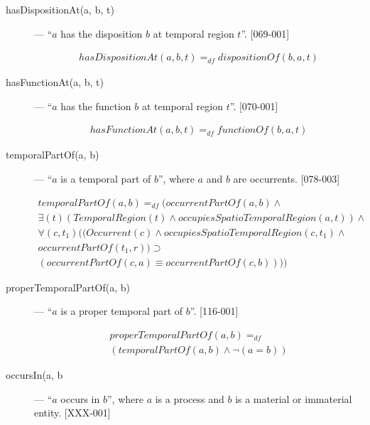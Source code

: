 \documentclass{article}
\newcommand{\DF}{\ensuremath{=_{df}}}
\begin{document}
\begin{description}
\item[hasDispositionAt(a, b, t)] --- ``$a$ has the disposition $b$ at temporal region $t$''. [069-001]

\begin{equation}
\begin{split}
hasDispositionAt(a, b, t) \DF dispositionOf(b, a, t)
\end{split}
\end{equation}

\item[hasFunctionAt(a, b, t)] --- ``$a$ has the function $b$ at temporal region $t$''. [070-001]

\begin{equation}
\begin{split}
hasFunctionAt(a, b, t) \DF functionOf(b, a, t)
\end{split}
\end{equation}

\item[temporalPartOf(a, b)] --- ``$a$ is a temporal part of $b$'', where $a$ and $b$ are occurrents. [078-003]

\begin{equation}
\begin{split}
temporalPartOf(a, b) \DF (occurrentPartOf(a, b) \wedge \\
{\exists}(t)(TemporalRegion(t) \wedge occupiesSpatioTemporalRegion(a, t)) \wedge \\
{\forall}(c, t_1)((Occurrent(c) \wedge occupiesSpatioTemporalRegion(c, t_1) \wedge \\
occurrentPartOf(t_1, r)) \supset \\
(occurrentPartOf(c, a) \equiv occurrentPartOf(c, b))))
\end{split}
\end{equation}

\item[properTemporalPartOf(a, b)] --- ``$a$ is a proper temporal part of $b$''. [116-001]

\begin{equation}
\begin{split}
properTemporalPartOf(a, b) \DF \\
(temporalPartOf(a, b) \wedge {\neg}(a = b))
\end{split}
\end{equation}

\item[occursIn(a, b] --- ``$a$ occurs in $b$'', where $a$ is a process and $b$ is a material or immaterial entity. [XXX-001]


\end{description}
\end{document}
